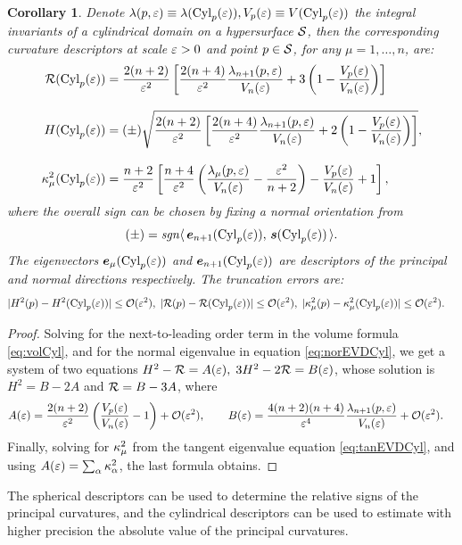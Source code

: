 \documentclass[letterpaper, reqno, 11pt]{amsart}
\newtheorem{corollary}[theorem]{Corollary}
\theoremstyle{definition}
\theoremstyle{remark}
\numberwithin{equation}{section}
\begin{document}
\begin{corollary}
	Denote $\lambda(p,\varepsilon)\equiv\lambda(\mathrm{Cyl}_p(\varepsilon)), V_p(\varepsilon)\equiv V(\mathrm{Cyl}_p(\varepsilon))$ the integral invariants of a cylindrical domain on a hypersurface ${\mathcal S}$, then the corresponding curvature descriptors at scale $\varepsilon>0$ and point $p\in{\mathcal S}$, for any $\mu=1,\dots,n$, are:
\begin{align}
	\mathcal{R}(\mathrm{Cyl}_p(\varepsilon)) & = \frac{2(n+2)}{\varepsilon^2}\left[ \frac{2(n+4)}{\varepsilon^2}\frac{\lambda_{n+1}(p,\varepsilon)}{V_n(\varepsilon)} + 3\left( 1-\frac{V_p(\varepsilon)}{V_n(\varepsilon)} \right) \right] \\[3mm]
	H(\mathrm{Cyl}_p(\varepsilon)) & = (\pm)\sqrt{ \frac{2(n+2)}{\varepsilon^2}\left[ \frac{2(n+4)}{\varepsilon^2}\frac{\lambda_{n+1}(p,\varepsilon)}{V_n(\varepsilon)} + 2\left( 1-\frac{V_p(\varepsilon)}{V_n(\varepsilon)} \right) \right] }, \\[3mm]
	\kappa^2_\mu(\mathrm{Cyl}_p(\varepsilon)) & = \frac{n+2}{\varepsilon^2}\left[ \frac{n+4}{\varepsilon^2}\left( \frac{\lambda_\mu(p,\varepsilon)}{V_n(\varepsilon)} -\frac{\varepsilon^2}{n+2} \right) -\frac{V_p(\varepsilon)}{V_n(\varepsilon)} +1 \right],
\end{align}
where the overall sign can be chosen by fixing a normal orientation from $$(\pm)=\text{\emph{sgn}}\langle\,\boldsymbol{e}_{n+1}(\mathrm{Cyl}_p(\varepsilon)),\,\boldsymbol{s}(\mathrm{Cyl}_p(\varepsilon))\,\rangle .$$ The eigenvectors $\boldsymbol{e}_\mu(\mathrm{Cyl}_p(\varepsilon))$ and $\boldsymbol{e}_{n+1}(\mathrm{Cyl}_p(\varepsilon))$ are descriptors of the principal and normal directions respectively. The truncation errors are: 
\begin{align*}
	& |H^2(p)-H^2(\mathrm{Cyl}_p(\varepsilon))|\leq{\mathcal O}(\varepsilon^2), \; |\mathcal{R}(p)-\mathcal{R}(\mathrm{Cyl}_p(\varepsilon)) |\leq{\mathcal O}(\varepsilon^2), \; |\kappa^2_\mu(p)-\kappa^2_\mu(\mathrm{Cyl}_p(\varepsilon))|\leq{\mathcal O}(\varepsilon^2).
\end{align*}
\end{corollary}
\begin{proof}
	Solving for the next-to-leading order term in the volume formula \ref{eq:volCyl}, and for the normal eigenvalue in equation \ref{eq:norEVDCyl}, we get a system of two equations $H^2-\mathcal{R} = A(\varepsilon),\; 3H^2 - 2\mathcal{R} = B(\varepsilon)$, whose solution is $H^2 = B-2A$ and $\mathcal{R}=B-3A$, where
\begin{align*}
	& A(\varepsilon) = \frac{2(n+2)}{\varepsilon^2}\left( \frac{V_p(\varepsilon)}{V_n(\varepsilon)} -1 \right) +{\mathcal O}(\varepsilon^2), \qquad
	 B(\varepsilon) = \frac{4(n+2)(n+4)}{\varepsilon^4}\frac{\lambda_{n+1}(p,\varepsilon)}{V_n(\varepsilon)} + {\mathcal O}(\varepsilon^2).
\end{align*}
Finally, solving for $\kappa^2_\mu$ from the tangent eigenvalue equation \ref{eq:tanEVDCyl}, and using $A(\varepsilon)=\sum_\alpha \kappa^2_\alpha$, the last formula obtains.
\end{proof}

The spherical descriptors can be used to determine the relative signs of the principal curvatures, and the cylindrical descriptors can be used to estimate with higher precision the absolute value of the principal curvatures.
\end{document}
